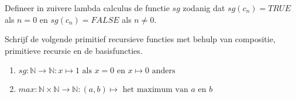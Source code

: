 \documentclass[a4paper]{article}
\begin{document}
\begin{question}
Defineer in zuivere lambda calculus de functie $sg$ zodanig dat $sg(c_n) = TRUE$ als $n = 0$ en $sg(c_n) = FALSE$ als $n \neq 0$.
\begin{answer}

\end{answer}
\end{question}

\begin{question}
Schrijf de volgende primitief recursieve functies met behulp van compositie, primitieve recursie en de basisfuncties.
\begin{enumerate}
  \item $sg : \mathbb{N} \to \mathbb{N} : x \mapsto 1 \text{ als $x = 0$ en $x \mapsto 0$ anders}$
  \item $max : \mathbb{N} \times \mathbb{N} \to \mathbb{N} : (a,b) \mapsto \text{ het maximum van $a$ en $b$}$
\end{enumerate}
\begin{answer}

\end{answer}
\end{question}
\end{document}
